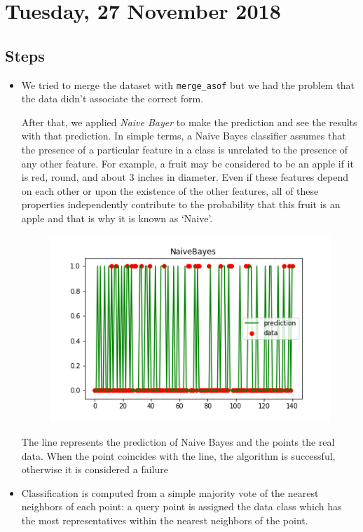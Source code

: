 \section{Tuesday, 27 November 2018}

\subsection{Steps}
\begin{itemize}
\item We tried to merge the dataset with \texttt{merge\_asof} but we had the problem that the data didn't associate the correct form.

After that, we applied \textit{Naive Bayer} to make the prediction and see the results with that prediction. In simple terms, a Naive Bayes classifier assumes that the presence of a particular feature in a class is unrelated to the presence of any other feature. For example, a fruit may be considered to be an apple if it is red, round, and about 3 inches in diameter. Even if these features depend on each other or upon the existence of the other features, all of these properties independently contribute to the probability that this fruit is an apple and that is why it is known as ‘Naive’.

\begin{figure}[H]
	\begin{center}
		

	\includegraphics[width=0.7\linewidth]{../../reports/figures/NaiveBayesPrediction}
	\label{fig:naivebayesprediction}
		\end{center}
\end{figure}

The line represents the prediction of Naive Bayes and the points the real data. When the point coincides with the line, the algorithm is successful, otherwise it is considered a failure

\item Classification is computed from a simple majority vote of the nearest neighbors of each point: a query point is assigned the data class which has the most representatives within the nearest neighbors of the point.


\end{itemize}
